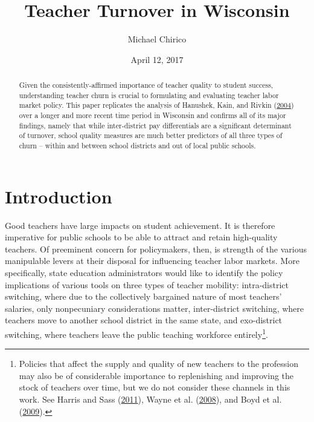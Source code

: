 \documentclass[12pt,]{article}
\title{Teacher Turnover in Wisconsin}
\author{Michael Chirico}
\date{April 12, 2017}
\let\rmarkdownfootnote\footnote%
\def\footnote{\protect\rmarkdownfootnote}
\begin{document}
\maketitle
\begin{abstract}
Given the consistently-affirmed importance of teacher quality to student
success, understanding teacher churn is crucial to formulating and
evaluating teacher labor market policy. This paper replicates the
analysis of Hanushek, Kain, and Rivkin
(\protect\hyperlink{ref-hanushek}{2004}) over a longer and more recent
time period in Wisconsin and confirms all of its major findings, namely
that while inter-district pay differentials are a significant
determinant of turnover, school quality measures are much better
predictors of all three types of churn -- within and between school
districts and out of local public schools.
\end{abstract}

\section{Introduction}\label{introduction}

Good teachers have large impacts on student achievement. It is therefore
imperative for public schools to be able to attract and retain
high-quality teachers. Of preeminent concern for policymakers, then, is
strength of the various manipulable levers at their disposal for
influencing teacher labor markets. More specifically, state education
administrators would like to identify the policy implications of various
tools on three types of teacher mobility: intra-district switching,
where due to the collectively bargained nature of most teachers'
salaries, only nonpecuniary considerations matter, inter-district
switching, where teachers move to another school district in the same
state, and exo-district switching, where teachers leave the public
teaching workforce entirely\footnote{Policies that affect the supply and
  quality of new teachers to the profession may also be of considerable
  importance to replenishing and improving the stock of teachers over
  time, but we do not consider these channels in this work. See Harris
  and Sass (\protect\hyperlink{ref-harris}{2011}), Wayne et al.
  (\protect\hyperlink{ref-wayne}{2008}), and Boyd et al.
  (\protect\hyperlink{ref-boyd2009}{2009}).}.
\end{document}
